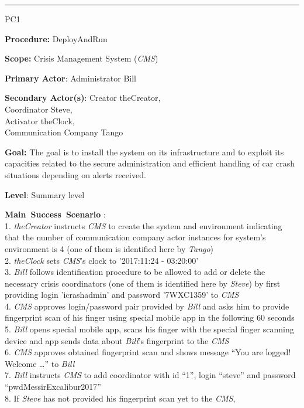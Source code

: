 \hrule
\begin{lyxlist}{PC1}
\small{
\item [\textbf{Procedure:}] DeployAndRun
\item [\textbf{Scope:}] Crisis Management System (\emph{CMS})
\item [\textbf{Primary Actor}:] Administrator Bill
\item [\textbf{Secondary Actor(s)}:] Creator theCreator,\\
                  Coordinator Steve,\\
                  Activator theClock,\\
                  Communication Company Tango
\item [\textbf{Goal:}] The goal is to install the \mysystemname system on its
infrastructure and to exploit its capacities related to the secure
administration and efficient handling of car crash situations depending on
alerts received.
\item [\textbf{Level}:] Summary level
\item [\textbf{Main~Success~Scenario}]:\\
1. \emph{theCreator} instructs \emph{CMS} to create the system and environment
indicating that the number of communication company actor instances for
system's environment is 4 (one of them is identified here by \emph{Tango})\\
2. \emph{theClock} sets \emph{CMS}'s clock to '2017:11:24 - 03:20:00'\\
3. \emph{Bill} follows identification procedure to be allowed to add or delete
the necessary crisis coordinators (one of them is identified here by
\emph{Steve}) by first providing login 'icrashadmin' and password '7WXC1359'
to \emph{CMS}\\
4. \emph{CMS} approves login/password pair provided by \emph{Bill} and asks
him to provide fingerprint scan of his finger using special mobile app in the
following 60 seconds\\
5. \emph{Bill} opens special mobile app, scans his finger with the special
finger scanning device and app sends data about \emph{Bill}'s fingerprint to
the \emph{CMS}\\
6. \emph{CMS} approves obtained fingerprint scan and shows message ``You are
logged! Welcome \ldots'' to \emph{Bill}\\
7. \emph{Bill} instructs \emph{CMS} to add coordinator with id ``1'',
login ``steve'' and password ``pwdMessirExcalibur2017''\\
8. If \emph{Steve} has not provided his fingerprint scan yet to the \emph{CMS},
}
\end{lyxlist}
